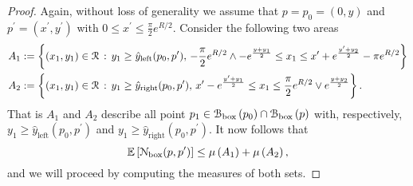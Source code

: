 \begin{proof}
Again, without loss of generality we assume that $p = p_0 = (0,y)$ and $p^\prime = (x^\prime, y^\prime)$ with $0 \le x^\prime \le \frac{\pi}{2} e^{R/2}$. Consider the following two areas
\begin{align*}
	A_1 &:= \left\{(x_1,y_1) \in {\mathcal R} \, : \, y_1 \ge \hat{y}_{\text{left}}(p_0,p^\prime), \, 
		-\frac{\pi}{2} e^{R/2} \wedge - e^{\frac{y + y_1}{2}} \le x_1 \le x^\prime + e^{\frac{y^\prime + y_2}{2}} - \pi e^{R/2} \right\}\\
	A_2 &:= \left\{(x_1,y_1) \in {\mathcal R} \, : \, y_1 \ge \hat{y}_{\text{right}}(p_0,p^\prime), \,
			x^\prime - e^{\frac{y^\prime + y_1}{2}} \le x_1 \le \frac{\pi}{2} e^{R/2} \vee e^{\frac{y + y_2}{2}} \right\}.
\end{align*}
That is $A_1$ and $A_2$ describe all point $p_1 \in {\mathcal B}_{\text{box}}\left(p_0\right) \cap {\mathcal B}_{\text{box}}\left(p\right)$ with, respectively, $y_1 \ge \hat{y}_{\text{left}}(p_0,p^\prime)$ and $y_1 \ge \hat{y}_{\text{right}}(p_0,p^\prime)$. It now follows that
\[
	\mathbb{E}\left[{\mathcal N}_{\text{box}}(p,p^\prime)\right] \le \mu\left(A_1\right) + \mu\left(A_2\right),
\]
and we will proceed by computing the measures of both sets. 


\end{proof}

